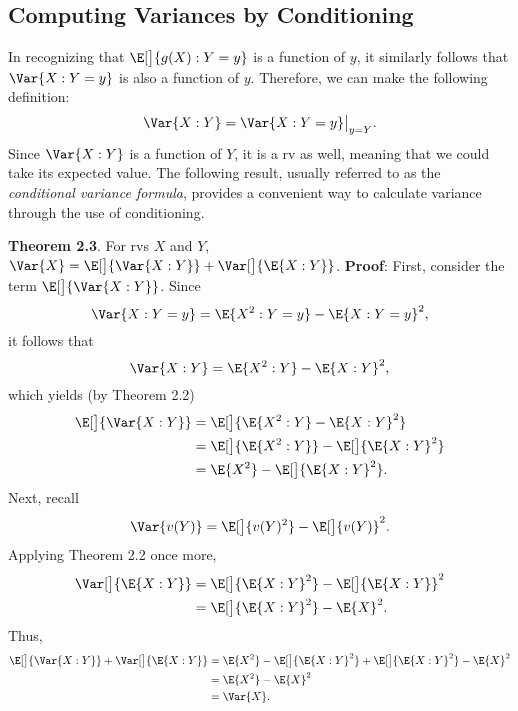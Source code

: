 \subsection*{Computing Variances by Conditioning}
\begin{Regular}
    In recognizing that $ \E[\big]{g(X)\given Y=y} $ is a function of $ y $, it similarly
    follows that $ \Var{X\given Y=y} $ is also a function of $ y $. Therefore, we can make the
    following definition:
    \[ \Var{X\given Y}=\Var{X\given Y=y}\bigr\rvert_{y=Y}. \]
    Since $ \Var{X\given Y} $ is a function of $ Y $, it is a rv as well, meaning that we could take its expected
    value. The following result, usually referred to as the \emph{conditional variance formula}, provides a
    convenient way to calculate variance through the use of conditioning.
\end{Regular}
\begin{Result}
    \textbf{Theorem 2.3}. For rvs $ X $ and $ Y $, $ \Var{X}=\E[\big]{\Var{X\given Y}}+\Var[\big]{\E{X\given Y}} $.
    \tcblower{}
    \textbf{Proof}: First, consider the term $ \E[\big]{\Var{X\given Y}} $. Since
    \[ \Var{X\given Y=y}=\E{X^2\given Y=y}-\E{X\given Y=y}^2, \]
    it follows that
    \[ \Var{X\given Y}=\E{X^2\given Y}-\E{X\given Y}^2, \]
    which yields (by Theorem 2.2)
    \begin{align*}
        \E[\big]{\Var{X\given Y}}
         & =\E[\big]{\E{X^2\given Y}-\E{X\given Y}^2}           \\
         & =\E[\big]{\E{X^2\given Y}}-\E[\big]{\E{X\given Y}^2} \\
         & =\E{X^2}-\E[\big]{\E{X\given Y}^2}.
    \end{align*}
    Next, recall
    \[ \Var{v(Y)}=\E[\big]{v(Y)^2}-\E[\big]{v(Y)}^2. \]
    Applying Theorem 2.2 once more,
    \begin{align*}
        \Var[\big]{\E{X\given Y}}
         & =\E[\big]{\E{X\given Y}^2}-\E[\big]{\E{X\given Y}}^2 \\
         & =\E[\big]{\E{X\given Y}^2}-\E{X}^2.
    \end{align*}
    Thus,
    \begin{align*}
        \E[\big]{\Var{X\given Y}}+\Var[\big]{\E{X\given Y}}
         & =\E{X^2}-\E[\big]{\E{X\given Y}^2}+\E[\big]{\E{X\given Y}^2}-\E{X}^2 \\
         & =\E{X^2}-\E{X}^2                                                     \\
         & =\Var{X}.
    \end{align*}
\end{Result}
